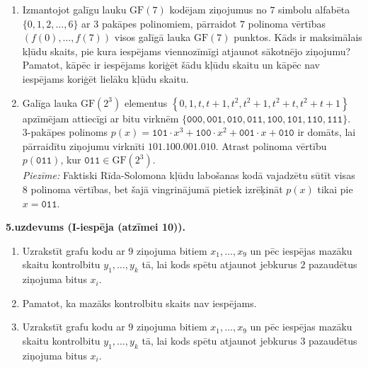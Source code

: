\documentclass[a4paper,12pt]{article}
\begin{document}
\begin{enumerate}
\item Izmantojot galīgu lauku $\text{GF}(7)$ kodējam ziņojumus no 
$7$ simbolu alfabēta $\{ 0,1,2,\ldots,6 \}$ ar $3$ pakāpes polinomiem, 
pārraidot $7$ polinoma vērtības $(f(0),\ldots,f(7))$ visos
galīgā lauka $\text{GF}(7)$ punktos. 
Kāds ir maksimālais kļūdu skaits, pie kura iespējams 
viennozīmīgi atjaunot sākotnējo ziņojumu?
Pamatot, kāpēc ir iespējams koriģēt šādu kļūdu skaitu un kāpēc nav
iespējams koriģēt lielāku kļūdu skaitu.
\item Galīga lauka $\text{GF}(2^3)$ elementus $\left\{ 0,1,t,t+1,t^2,t^2+1,t^2+t,t^2+t+1 \right\}$
apzīmējam attiecīgi ar bitu virknēm $\{\mathtt{000},\mathtt{001},\mathtt{010},\mathtt{011},
\mathtt{100},\mathtt{101},\mathtt{110},\mathtt{111}\}$.\\
$3$-pakāpes polinoms $p(x) = \mathtt{101}\cdot{}x^3 + \mathtt{100}\cdot{}x^2 + \mathtt{001}\cdot{}x + \mathtt{010}$
ir domāts, lai pārraidītu ziņojumu virknīti $\mathtt{101.100.001.010}$. 
Atrast polinoma vērtību $p(\mathtt{011})$, kur $\mathtt{011}\in\text{GF}(2^3)$.\\
{\em Piezīme:} Faktiski Rīda-Solomona kļūdu labošanas kodā vajadzētu sūtīt 
visas $8$ polinoma vērtības, bet šajā vingrinājumā pietiek izrēķināt $p(x)$ tikai pie $x=\mathtt{011}$. 
\end{enumerate}




\vspace{10pt}
{\bf 5.uzdevums (I-iespēja (atzīmei 10)).}

\begin{enumerate}
\item Uzrakstīt grafu kodu ar $9$ ziņojuma bitiem $x_1,\ldots,x_{9}$ 
un pēc iespējas mazāku skaitu kontrolbitu $y_1,\ldots,y_k$ tā, 
lai kods spētu atjaunot jebkurus $2$ pazaudētus ziņojuma bitus $x_i$.
\item Pamatot, ka mazāks kontrolbitu skaits nav iespējams.
\item Uzrakstīt grafu kodu ar $9$ ziņojuma bitiem $x_1,\ldots,x_{9}$ 
un pēc iespējas mazāku skaitu kontrolbitu $y_1,\ldots,y_k$ tā, 
lai kods spētu atjaunot jebkurus $3$ pazaudētus ziņojuma bitus $x_i$.
\end{enumerate}
\end{document}
